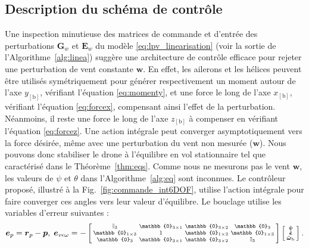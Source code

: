 \subsection{Description du schéma de contrôle}
\label{sec:ctl_sche}

Une inspection minutieuse des matrices de commande et d'entrée des perturbations $\boldsymbol{G}_{w}$ et $\boldsymbol{E}_{w}$ du modèle \eqref{eq:lpv_linearisation} (voir la sortie de l'Algorithme~\ref{alg:linea}) suggère une architecture de contrôle efficace pour rejeter une perturbation de vent constante $\boldsymbol{w}$. En effet, les ailerons et les hélices peuvent être utilisés symétriquement pour générer respectivement un moment autour de l'axe $y_{[\text{b}]}$, vérifiant l'équation \eqref{eq:momenty}, et une force le long de l'axe $x_{[\text{b}]}$, vérifiant l'équation \eqref{eq:forcex}, compensant ainsi l'effet de la perturbation. Néanmoins, il reste une force le long de l'axe $z_{[\text{b}]}$ à compenser en vérifiant l'équation \eqref{eq:forcez}. Une action intégrale peut converger asymptotiquement vers la force désirée, même avec une perturbation du vent non mesurée ($\boldsymbol{w}$). Nous pouvons donc stabiliser le drone à l'équilibre en vol stationnaire tel que caractérisé dans le Théorème~\ref{thm:eqs}. Comme nous ne mesurons pas le vent $\boldsymbol{w}$, les valeurs de $\psi$ et $\theta$ dans l'Algorithme~\ref{alg:eq} sont inconnues. Le contrôleur proposé, illustré à la Fig.~\ref{fig:commande_int6DOF}, utilise l'action intégrale pour faire converger ces angles vers leur valeur d'équilibre. Le bouclage utilise les variables d'erreur suivantes : 
\begin{align}
    \boldsymbol{e}_{p}= \boldsymbol{r}_{p} - \boldsymbol{p}, \; \boldsymbol{e}_{v \epsilon \omega} = -  
       \left[ \begin{smallmatrix} \mathbb{I}_{3}  & \mathbb{0}_{3\times 1} & \mathbb{0}_{3\times 2} & \mathbb{0}_{3}\\
       \mathbb{0}_{1\times 3}  & 1 & \mathbb{0}_{1\times 2} & \mathbb{0}_{1 \times 3} \\
           \mathbb{0}_{3}  & \mathbb{0}_{3\times 1} & \mathbb{0}_{3\times 2} &   \mathbb{I}_{3}
           \end{smallmatrix} \right]
    \smallmat{
           \tilde{\boldsymbol{v}} \\
           \tilde{\boldsymbol{\epsilon}} \\
           \tilde{\boldsymbol{\omega}}_{\text{b}} 
    }.
  \label{eq:error_var}
\end{align} 

